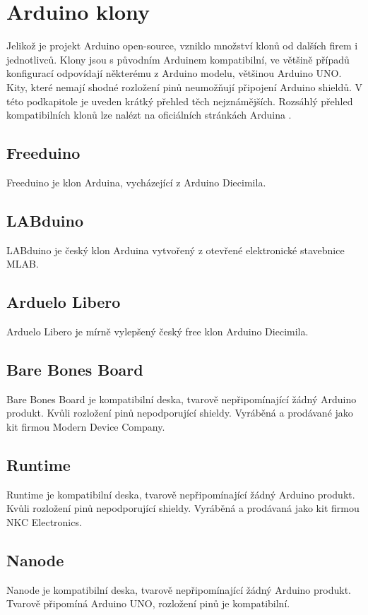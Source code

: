 \section{Arduino klony}
\label{KapArduinoKlony}

	Jelikož je projekt Arduino open-source, vzniklo množství klonů od dalších firem i jednotlivců. Klony jsou s původním Arduinem kompatibilní, ve většině případů konfigurací odpovídají některému z Arduino modelu, většinou Arduino UNO. Kity, které nemají shodné rozložení pinů neumožňují připojení Arduino shieldů. V této podkapitole je uveden krátký přehled těch nejznámějších. Rozsáhlý přehled kompatibilních klonů lze nalézt na oficiálních stránkách Arduina \cite{ArduinoClonesWeb}.
	
	\subsection{Freeduino} 
	Freeduino je klon Arduina, vycházející z Arduino Diecimila.
	
	\subsection{LABduino} 
	LABduino je český klon Arduina vytvořený z otevřené elektronické stavebnice MLAB.
	
	\subsection{Arduelo Libero}	
	Arduelo Libero je mírně vylepšený český free klon Arduino Diecimila.
	
	\subsection{Bare Bones Board} 
	Bare Bones Board je kompatibilní deska, tvarově nepřipomínající žádný Arduino produkt. Kvůli rozložení pinů nepodporující shieldy. Vyráběná a prodávané jako kit firmou Modern Device Company.
	
	\subsection{Runtime} 
	Runtime je kompatibilní deska, tvarově nepřipomínající žádný Arduino produkt. Kvůli rozložení pinů nepodporující shieldy. Vyráběná a prodávaná jako kit firmou NKC Electronics.
	
	\subsection{Nanode} 
	Nanode je kompatibilní deska, tvarově nepřipomínající žádný Arduino produkt. Tvarově připomíná Arduino UNO, rozložení pinů je kompatibilní.
	
